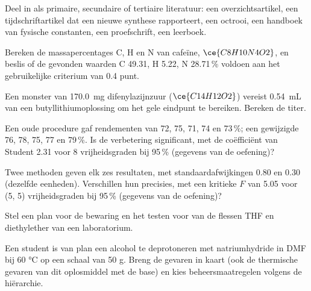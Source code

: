 \begin{exercise}[$\star$]\label{exo:b3:lab-techniques-3:4}
Deel in als primaire, secundaire of tertiaire literatuur: een
overzichtsartikel, een tijdschriftartikel dat een nieuwe synthese
rapporteert, een octrooi, een handboek van fysische constanten, een
proefschrift, een leerboek.
\end{exercise}

\begin{exercise}[$\star\star$]\label{exo:b3:lab-techniques-3:5}
Bereken de massapercentages C, H en N van cafeïne, $\ce{C8H10N4O2}$, en beslis of de gevonden
waarden C 49.31, H 5.22, N 28.71\,\% voldoen aan het gebruikelijke
criterium van 0.4 punt.
\end{exercise}

\begin{exercise}[$\star\star$]\label{exo:b3:lab-techniques-3:6}
Een monster van \qty{170.0}{mg} difenylazijnzuur ($\ce{C14H12O2}$) vereist \qty{0.54}{mL} van een butyllithiumoplossing om
het gele eindpunt te bereiken. Bereken de titer.
\end{exercise}

\begin{exercise}[$\star\star$]\label{exo:b3:lab-techniques-3:7}
Een oude procedure gaf rendementen van 72, 75, 71, 74 en 73\,\%; een
gewijzigde 76, 78, 75, 77 en
79\,\%. Is de verbetering significant, met de coëfficiënt van Student
2.31 voor 8 vrijheidsgraden bij 95\,\% (gegevens van de oefening)?
\end{exercise}

\begin{exercise}[$\star\star$]\label{exo:b3:lab-techniques-3:8}
Twee methoden geven elk zes resultaten, met standaardafwijkingen 0.80 en
0.30 (dezelfde eenheden). Verschillen hun precisies, met een kritieke $F$ van 5.05 voor (5, 5) vrijheidsgraden bij 95\,\% (gegevens van de
oefening)?
\end{exercise}

\begin{exercise}[$\star\star$]\label{exo:b3:lab-techniques-3:9}
Stel een plan voor de bewaring en het testen voor van de flessen THF en
diethylether van een laboratorium.
\end{exercise}

\begin{exercise}[$\star\star\star$]\label{exo:b3:lab-techniques-3:10}
Een student is van plan een alcohol te deprotoneren met natriumhydride in
DMF bij 60 °C op een schaal van 50 g. Breng de gevaren in kaart (ook de
thermische gevaren van dit oplosmiddel met de base) en kies
beheersmaatregelen volgens de hiërarchie.
\end{exercise}


